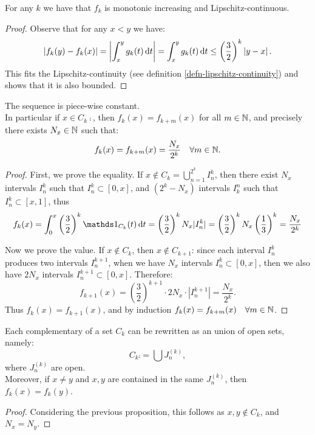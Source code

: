 \begin{prop}\label{prop-second-vitali}
	For any $k$ we have that $f_k$ is monotonic increasing and Lipschitz-continuous.
\end{prop}
\begin{proof}
	Observe that for any $x < y$ we have:
	$$
	|f_k(y) - f_k(x)| 
	= \left\lvert\int_x^y g_k(t) \, \mathrm d t\right\rvert 
	= \int_x^y g_k(t) \, \mathrm d t 
	\le \left( \frac 3 2 \right)^k \left\lvert y-x\right\rvert
	.
	$$
	This fits the Lipschitz-continuity (see definition \vref{defn-lipschitz-continuity}) and shows that it is also bounded.
\end{proof}

\begin{prop}\label{prop-third-vitali}
	The sequence is piece-wise constant.\\
	In particular if  $x \in C_k\comp$, then $f_k(x) = f_{k+m}(x)$ for all $m \in \mathbb N$, and precisely there exists $N_x \in \mathbb N$ such that:
	$$
	f_k(x) 
	= f_{k+m}(x) 
	= \frac{N_x}{2^k} 
	\quad \forall m \in \mathbb N
	.
	$$
\end{prop}
\begin{proof}
	First, we prove the equality. If $x \notin C_k = \bigcup_{n=1}^{2^k} I_n^k$, then there exist $N_x$ intervals $I_n^k$ such that $I_n^k \subset [0, x]$, and $(2^k-N_x)$ intervals $I_k^n$ such that $I_n^k \subset [x, 1]$, thus
	$$f_k(x)
	= \int_0^x \left( \frac 3 2 \right)^k \Ind_{C_k}(t) \, \dt
	= \left( \frac 3 2 \right)^k N_x |I_n^k|
	= \left( \frac 3 2 \right)^k N_x  \left( \frac 1 3 \right)^k
	= \frac{N_x}{2^k}$$
	
	Now we prove the value. If $x \notin C_k$, then $x \notin C_{k+1}$: since each interval $I_n^k$ produces two intervals $I_n^{k+1}$, when we have $N_x$ intervals $I_n^k \subset [0, x]$, then we also have $2N_x$ intervals $I_n^{k+1} \subset [0, x]$. Therefore:
	$$f_{k+1}(x) = \left( \frac 3 2 \right)^{k+1} \cdot 2N_x \cdot |I_n^{k+1}| = \frac{N_x}{2^k}.$$
	Thus $f_k(x) = f_{k+1}(x)$, and by induction $f_k(x) = f_{k+m}(x) \quad \forall m \in \mathbb N$.
\end{proof}

\begin{prop}\label{prop-fourth-vitali}
	Each complementary of a set $C_k$ can be rewritten as an union of open sets, namely:
	$$
	C_k\comp 
	= \bigcup J_n^{(k)}
	,
	$$
	where $J_n^{(k)}$ are open.\\
	Moreover, if $x \neq y$ and $x, y$ are contained in the same $J_n^{(k)}$, then $f_k(x) = f_k(y)$.
\end{prop}
\begin{proof}
	Considering the previous proposition, this follows as $x, y \notin C_k$, and $N_x = N_y$.
\end{proof}

